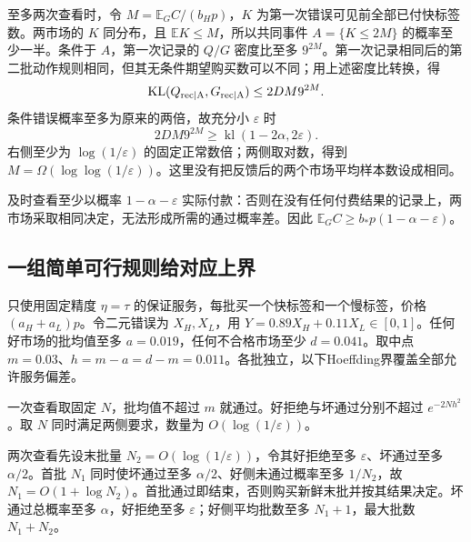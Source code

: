 \documentclass[UTF8,fontset=windows,11pt,a4paper]{ctexart}
\numberwithin{equation}{section}
\begin{document}
至多两次查看时，令 $M=\mathbb E_GC/(b_Hp)$，$K$ 为第一次错误可见前全部已付快标签数。两市场的 $K$ 同分布，且 $\mathbb E K\le M$，所以共同事件 $A=\{K\le2M\}$ 的概率至少一半。条件于 $A$，第一次记录的 $Q/G$ 密度比至多 $9^{2M}$。第一次记录相同后的第二批动作规则相同，但其无条件期望购买数可以不同；用上述密度比转换，得
\begin{equation}
 \operatorname{KL}(Q_{\rm rec\mid A},G_{\rm rec\mid A})
 \le2DM9^{2M}.
\end{equation}
条件错误概率至多为原来的两倍，故充分小 $\varepsilon$ 时
\begin{equation}
 2DM9^{2M}\ge\operatorname{kl}(1-2\alpha,2\varepsilon).
\end{equation}
右侧至少为 $\log(1/\varepsilon)$ 的固定正常数倍；两侧取对数，得到 $M=\Omega(\log\log(1/\varepsilon))$。这里没有把反馈后的两个市场平均样本数设成相同。

及时查看至少以概率 $1-\alpha-\varepsilon$ 实际付款：否则在没有任何付费结果的记录上，两市场采取相同决定，无法形成所需的通过概率差。因此 $\mathbb E_GC\ge b_*p(1-\alpha-\varepsilon)$。

\subsection{一组简单可行规则给对应上界}
只使用固定精度 $\eta=\tau$ 的保证服务，每批买一个快标签和一个慢标签，价格 $(a_H+a_L)p$。令二元错误为 $X_H,X_L$，用 $Y=0.89X_H+0.11X_L\in[0,1]$。任何好市场的批均值至多 $a=0.019$，任何不合格市场至少 $d=0.041$。取中点 $m=0.03$、$h=m-a=d-m=0.011$。各批独立，以下Hoeffding界覆盖全部允许服务偏差。

一次查看取固定 $N$，批均值不超过 $m$ 就通过。好拒绝与坏通过分别不超过 $e^{-2Nh^2}$。取 $N$ 同时满足两侧要求，数量为 $O(\log(1/\varepsilon))$。

两次查看先设末批量 $N_2=O(\log(1/\varepsilon))$，令其好拒绝至多 $\varepsilon$、坏通过至多 $\alpha/2$。首批 $N_1$ 同时使坏通过至多 $\alpha/2$、好侧未通过概率至多 $1/N_2$，故 $N_1=O(1+\log N_2)$。首批通过即结束，否则购买新鲜末批并按其结果决定。坏通过总概率至多 $\alpha$，好拒绝至多 $\varepsilon$；好侧平均批数至多 $N_1+1$，最大批数 $N_1+N_2$。
\end{document}
